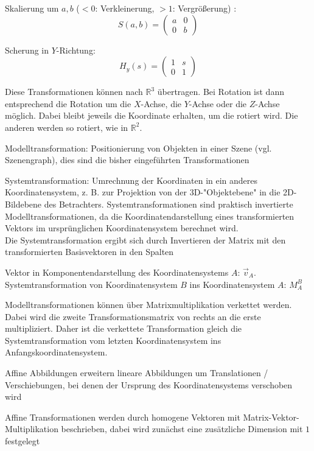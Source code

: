 \documentclass[12pt,landscape]{article}
\begin{document}
\begin{multicols}{3}
\begin{compactitem}
\item Skalierung um $a, b$ ($< 0$: Verkleinerung, $> 1$: Vergrößerung) : \[ S(a,b) = \begin{pmatrix}
a & 0 \\ 0 & b
\end{pmatrix} \]
\item Scherung in $Y$-Richtung:
\[
H_{y}(s) = \begin{pmatrix}
1 & s \\ 0 & 1
\end{pmatrix}
\]
\item Diese Transformationen können nach $\mathbb{R}^3$ übertragen. Bei Rotation ist dann entsprechend die Rotation um die $X$-Achse, die $Y$-Achse oder die $Z$-Achse möglich. Dabei bleibt jeweils die Koordinate erhalten, um die rotiert wird. Die anderen werden so rotiert, wie in $\mathbb{R}^2$.
\item Modelltransformation: Positionierung von Objekten in einer Szene (vgl. Szenengraph), dies sind die bisher eingeführten Transformationen
\item Systemtransformation: Umrechnung der Koordinaten in ein anderes Koordinatensystem, z. B. zur Projektion von der 3D-"Objektebene" in die 2D-Bildebene des Betrachters. Systemtransformationen sind praktisch invertierte Modelltransformationen, da die Koordinatendarstellung eines transformierten Vektors im ursprünglichen Koordinatensystem berechnet wird. \\ Die Systemtransformation ergibt sich durch Invertieren der Matrix mit den transformierten Basisvektoren in den Spalten
\item Vektor in Komponentendarstellung des Koordinatensystems $A$: $\vec{v}_A$. Systemtransformation von Koordinatensystem $B$ ins Koordinatensystem $A$: $M^{B}_{A}$
\item Modelltransformationen können über Matrixmultiplikation verkettet werden. Dabei wird die zweite Transformationsmatrix von rechts an die erste multipliziert. Daher ist die verkettete Transformation gleich die Systemtransformation vom letzten Koordinatensystem ins Anfangskoordinatensystem.
\item Affine Abbildungen erweitern lineare Abbildungen um Translationen / Verschiebungen, bei denen der Ursprung des Koordinatensystems verschoben wird
\item Affine Transformationen werden durch homogene Vektoren mit Matrix-Vektor-Multiplikation beschrieben, dabei wird zunächst eine zusätzliche Dimension mit $1$ festgelegt \\

\end{compactitem}
\end{multicols}
\end{document}
